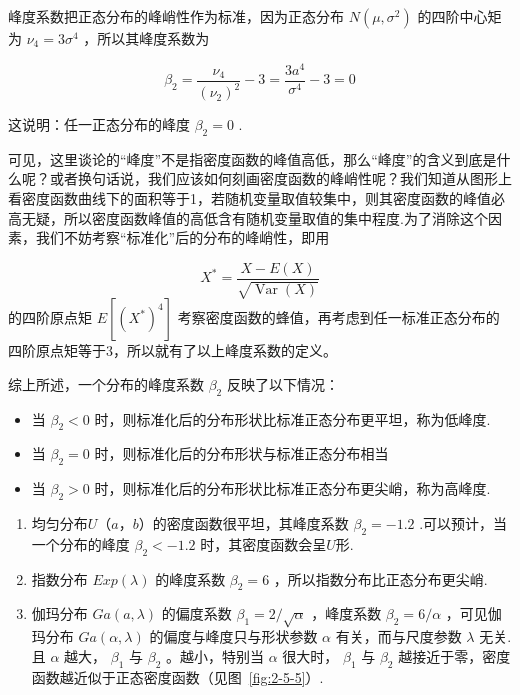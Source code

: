 峰度系数把正态分布的峰峭性作为标准，因为正态分布 $N\left(\mu, \sigma^{2}\right)$ 的四阶中心矩为 $\nu_{4}=3 \sigma^{4}$ ，所以其峰度系数为

\[
\beta_{2}=\frac{\nu_{4}}{\left(\nu_{2}\right)^{2}}-3=\frac{3 a^{4}}{\sigma^{4}}-3=0
\]

这说明：任一正态分布的峰度 $\beta_{2}=0$ .

可见，这里谈论的“峰度”不是指密度函数的峰值高低，那么“峰度”的含义到底是什么呢？或者换句话说，我们应该如何刻画密度函数的峰峭性呢？我们知道从图形上看密度函数曲线下的面积等于1，若随机变量取值较集中，则其密度函数的峰值必高无疑，所以密度函数峰值的高低含有随机变量取值的集中程度.为了消除这个因素，我们不妨考察“标准化”后的分布的峰峭性，即用

\[
X^{*}=\frac{X-E(X)}{\sqrt{\operatorname{Var}(X)}}
\]
的四阶原点矩 $E\left[\left(X^{*}\right)^{4}\right]$ 考察密度函数的蜂值，再考虑到任一标准正态分布的四阶原点矩等于3，所以就有了以上峰度系数的定义。

综上所述，一个分布的峰度系数 $\beta_{2}$ 反映了以下情况：

\begin{itemize}
	\item 当 $\beta_{2}<0$ 时，则标准化后的分布形状比标准正态分布更平坦，称为低峰度.
	\item 当 $\beta_{2}=0$ 时，则标准化后的分布形状与标准正态分布相当
	\item 当 $\beta_{2}>0$ 时，则标准化后的分布形状比标准正态分布更尖峭，称为高峰度.
\end{itemize}

\begin{example}
	\begin{enumerate}
		\item 均匀分布$ U（a，b） $的密度函数很平坦，其峰度系数 $\beta_{2}= -1.2 $ .可以预计，当一个分布的峰度 $\beta_{2}<-1.2$ 时，其密度函数会呈$ U $形.
		\item 指数分布 $E x p(\lambda)$ 的峰度系数 $\beta_{2}=6$ ，所以指数分布比正态分布更尖峭.
		\item 伽玛分布 $G a(a, \lambda)$ 的偏度系数 $\beta_{1}=2 / \sqrt{\alpha}$ ，峰度系数 $\beta_{2}=6 / \alpha$ ，可见伽玛分布 $G a(\alpha, \lambda)$ 的偏度与峰度只与形状参数 $\alpha$ 有关，而与尺度参数 $\lambda$ 无关.且 $\alpha$  越大， $\beta_{1}$ 与 $\beta_{2}$ 。越小，特别当 $\alpha$  很大时， $\beta_{1}$ 与 $\beta_{2}$ 越接近于零，密度函数越近似于正态密度函数（见图~\ref{fig:2-5-5}）.
	\end{enumerate}
\end{example}

